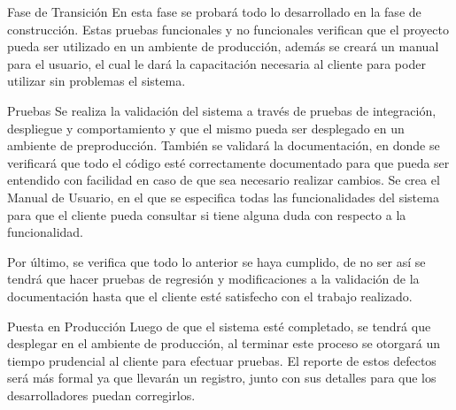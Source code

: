 Fase de Transición
En esta fase se probará todo lo desarrollado en la fase de construcción. Estas pruebas funcionales y no funcionales verifican que el proyecto pueda ser utilizado en un ambiente de producción, además se creará un manual para el usuario, el cual le dará la capacitación necesaria al cliente para poder utilizar sin problemas el sistema.

Pruebas
Se realiza la validación del sistema a través de pruebas de integración, despliegue y comportamiento y que el mismo pueda ser desplegado en un ambiente de preproducción. También se validará la documentación, en donde se verificará que todo el código esté correctamente documentado para que pueda ser entendido con facilidad en caso de que sea necesario realizar cambios. Se crea el Manual de Usuario, en el que se especifica todas las funcionalidades del sistema para que el cliente pueda consultar si tiene alguna duda con respecto a la funcionalidad.

Por último, se verifica que todo lo anterior se haya cumplido, de no ser así se tendrá que hacer pruebas de regresión y modificaciones a la validación de la documentación hasta que el cliente esté  satisfecho con el trabajo realizado.

Puesta en Producción
Luego de que el sistema esté completado, se tendrá que desplegar en el ambiente de producción, al terminar este proceso se otorgará un tiempo prudencial al cliente para efectuar pruebas. El reporte de estos defectos será más formal ya que llevarán un registro, junto con sus detalles para que los desarrolladores puedan corregirlos.



